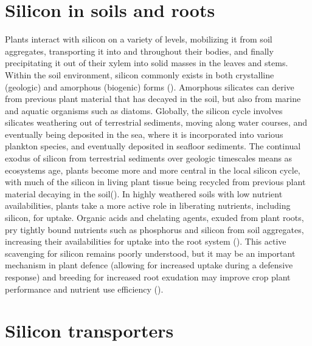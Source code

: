 \documentclass[12pt, letterpaper, ]{report}
\begin{document}
\section{Silicon in soils and roots}

Plants interact with silicon on a variety of levels, mobilizing it from soil aggregates, transporting it into and throughout their bodies, and finally precipitating it out of their xylem into solid masses in the leaves and stems. Within the soil environment, silicon commonly exists in both crystalline (geologic) and amorphous (biogenic) forms (\cite{haynes_contemporary_2014}). Amorphous silicates can derive from previous plant material that has decayed in the soil, but also from marine and aquatic organisms such as diatoms. Globally, the silicon cycle involves silicates weathering out of terrestrial sediments, moving along water courses, and eventually being deposited in the sea, where it is incorporated into various plankton species, and eventually deposited in seafloor sediments. The continual exodus of silicon from terrestrial sediments over geologic timescales means as ecosystems age, plants become more and more central in the local silicon cycle, with much of the silicon in living plant tissue being recycled from previous plant material decaying in the soil(\cite{de_tombeur_plants_2020}). In highly weathered soils with low nutrient availabilities, plants take a more active role in liberating nutrients, including silicon, for uptake. Organic acids and chelating agents, exuded from plant roots, pry tightly bound nutrients such as phosphorus and silicon from soil aggregates, increasing their availabilities for uptake into the root system (\cite{de_tombeur_silicon_2021-1}). This active scavenging for silicon remains poorly understood, but it may be an important mechanism in plant defence (allowing for increased uptake during a defensive response) and breeding for increased root exudation may improve crop plant performance and nutrient use efficiency (\cite{de_tombeur_silicon_2021}).

\section{Silicon transporters}	
\end{document}

